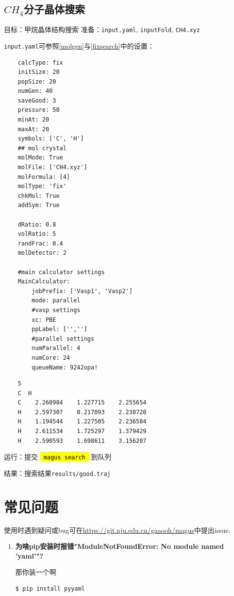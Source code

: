 \documentclass[12pt]{article}
\newcommand{\code}[1]{
  \begingroup
  \sethlcolor{Seashell}
  {\hl{\texttt{~#1~}}}
  \endgroup
}
\newcommand{\file}[1]{\texttt{#1}}
\begin{document}
\subsection{\texorpdfstring{$CH_4$分子晶体搜索}{CH4分子晶体搜索}}
目标：甲烷晶体结构搜索
准备：\file{input.yaml}, \file{inputFold}, \file{CH4.xyz}\par
\file{input.yaml}可参照\ref{molgen}与\ref{fixsearch}中的设置：
\begin{tcolorbox}[enhanced, breakable, title=\file{MTP/pot.mtp}]
\begin{verbatim} 
    calcType: fix                                                              
    initSize: 20
    popSize: 20
    numGen: 40
    saveGood: 3
    pressure: 50
    minAt: 20
    maxAt: 20
    symbols: ['C', 'H']
    ## mol crystal
    molMode: True
    molFile: ['CH4.xyz']
    molFormula: [4] 
    molType: 'fix'
    chkMol: True
    addSym: True
    
    dRatio: 0.8 
    volRatio: 5
    randFrac: 0.4 
    molDetector: 2
    
    #main calculator settings
    MainCalculator:
        jobPrefix: ['Vasp1', 'Vasp2']
        mode: parallel
        #vasp settings
        xc: PBE 
        ppLabel: ['','']
        #parallel settings
        numParallel: 4
        numCore: 24
        queueName: 9242opa!
\end{verbatim}
\end{tcolorbox}
\begin{tcolorbox}[enhanced, breakable, title=\file{MTP/pot.mtp}]
    \begin{verbatim} 
    5                                                                          
    C  H   
    C    2.260984    1.227715    2.255654
    H    2.597307    0.217093    2.238728
    H    1.194544    1.227505    2.236584
    H    2.611534    1.725297    1.379429
    H    2.590593    1.698611    3.156207
    \end{verbatim}
\end{tcolorbox}
运行：提交\code{magus search} 到队列\par
结果：搜索结果\file{results/good.traj}
\newpage
\section{常见问题}
使用时遇到疑问或bug可在\textcolor{blue}{\url{https://git.nju.edu.cn/gaaooh/magus}}中提出issue.
\begin{enumerate}
    \item \textbf{为啥pip安装时报错"ModuleNotFoundError: No module named 'yaml'"?}
    \par
    那你装一个啊
    \begin{tcolorbox}
        \begin{verbatim} 
$ pip install pyyaml
        \end{verbatim}
    \end{tcolorbox}
    
\end{enumerate}
\end{document}
